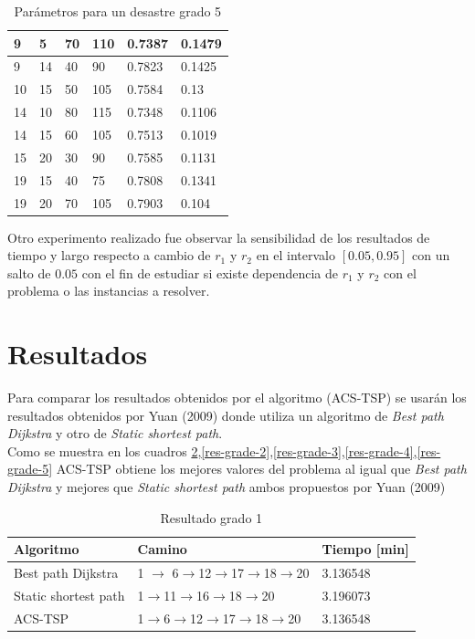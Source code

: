 \documentclass[letter, 10pt]{article}
\begin{document}
\begin{table}[H]
\begin{tabular}{|l|l|l|l|l|l|}
9 & 5 & 70 & 110 & 0.7387 & 0.1479 \\ \hline
9 & 14 & 40 & 90 & 0.7823 & 0.1425 \\ \hline
10 & 15 & 50 & 105 & 0.7584 & 0.13 \\ \hline
14 & 10 & 80 & 115 & 0.7348 & 0.1106 \\ \hline
14 & 15 & 60 & 105 & 0.7513 & 0.1019 \\ \hline
15 & 20 & 30 & 90 & 0.7585 & 0.1131 \\ \hline
19 & 15 & 40 & 75 & 0.7808 & 0.1341 \\ \hline
19 & 20 & 70 & 105 & 0.7903 & 0.104 \\ \hline
\end{tabular}
\caption{Parámetros para un desastre grado 5}\label{grade5}
\end{table}

Otro experimento realizado fue observar la sensibilidad de los resultados de tiempo y largo respecto a cambio de $r_1$ y $r_2$ en el intervalo $[0.05,0.95]$ con un salto de $0.05$ con el fin de estudiar si existe dependencia de $r_1$ y $r_2$ con el problema o las instancias a resolver.
\section{Resultados}

Para comparar los resultados obtenidos por el algoritmo (ACS-TSP) se usarán los resultados obtenidos por Yuan (2009) \cite{Yuan20091081} donde utiliza un algoritmo de \textit{Best path Dijkstra} y otro de \textit{Static shortest path}. \\

Como se muestra en los cuadros \ref{res-grade-1},\ref{res-grade-2},\ref{res-grade-3},\ref{res-grade-4},\ref{res-grade-5} ACS-TSP obtiene los mejores valores del problema al igual que \textit{Best path Dijkstra} y mejores que \textit{Static shortest path} ambos propuestos por  Yuan (2009)\cite{Yuan20091081}
\begin{table}[H]
\centering
\begin{tabular}{|l|l|l|}
\hline
Algoritmo            & Camino           & Tiempo {[}min{]} \\ \hline
Best path Dijkstra   & 1 $\rightarrow$ 6$\rightarrow$12$\rightarrow$17$\rightarrow$18$\rightarrow$20 & 3.136548         \\ \hline
Static shortest path & 1$\rightarrow$11$\rightarrow$16$\rightarrow$18$\rightarrow$20    & 3.196073         \\ \hline
ACS-TSP              & 1$\rightarrow$6$\rightarrow$12$\rightarrow$17$\rightarrow$18$\rightarrow$20 & 3.136548         \\ \hline
\end{tabular}
\caption{Resultado grado 1}
\label{res-grade-1}
\end{table}
\end{document}
